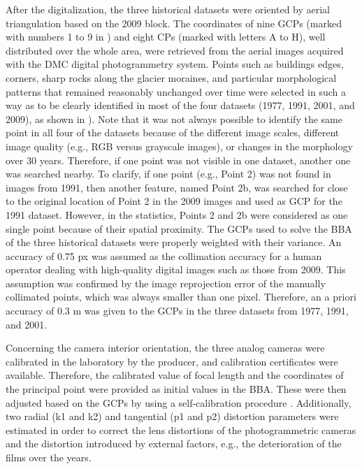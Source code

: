 After the digitalization, the three historical datasets were oriented by aerial triangulation based on the 2009 block. The coordinates of nine GCPs (marked with numbers 1 to 9 in ) and eight CPs (marked with letters A to H), well distributed over the whole area, were retrieved from the aerial images acquired with the DMC digital photogrammetry system.
Points such as buildings edges, corners, sharp rocks along the glacier moraines, and particular morphological patterns that remained reasonably unchanged over time were selected in such a way as to be clearly identified in most of the four datasets (1977, 1991, 2001, and 2009), as shown in ).
Note that it was not always possible to identify the same point in all four of the datasets because of the different image scales, different image quality (e.g., RGB versus grayscale images), or changes in the morphology over 30 years. Therefore, if one point was not visible in one dataset, another one was searched nearby. To clarify, if one point (e.g., Point 2) was not found in images from 1991, then another feature, named Point 2b, was searched for close to the original location of Point 2 in the 2009 images and used as GCP for the 1991 dataset. However, in the statistics, Points 2 and 2b were considered as one single point because of their spatial proximity.
The GCPs used to solve the BBA of the three historical datasets were properly weighted with their variance. An accuracy of 0.75 px was assumed as the collimation accuracy for a human operator dealing with high-quality digital images such as those from 2009. This assumption was confirmed by the image reprojection error of the manually collimated points, which was always smaller than one pixel. Therefore, an a priori accuracy of 0.3 m was given to the GCPs in the three datasets from 1977, 1991, and 2001.

Concerning the camera interior orientation, the three analog cameras were calibrated in the laboratory by the producer, and calibration certificates were available. Therefore, the calibrated value of focal length and the coordinates of the principal point were provided as initial values in the BBA. These were then adjusted based on the GCPs by using a self-calibration procedure \citep{jacobsen2004issues}. Additionally, two radial (k1 and k2) and tangential (p1 and p2) distortion parameters were estimated in order to correct the lens distortions of the photogrammetric cameras and the distortion introduced by external factors, e.g., the deterioration of the films over the years.

